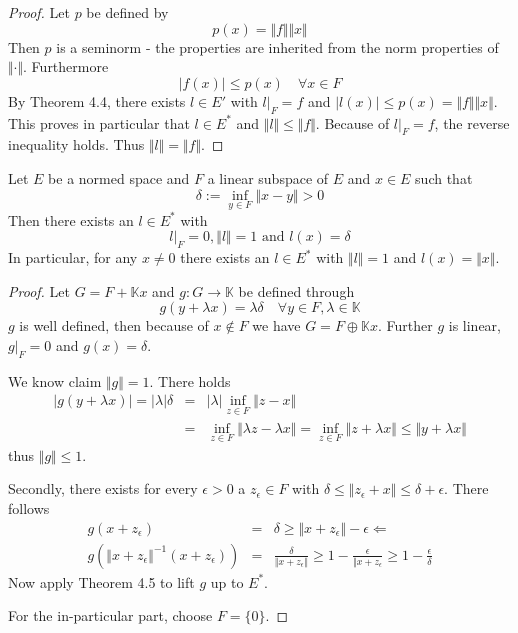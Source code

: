 \begin{proof}
Let $p$ be defined by
\begin{equation*}
p(x) = \Vert f \Vert \Vert x \Vert
\end{equation*}
Then $p$ is a seminorm - the properties are inherited from the norm properties of $\Vert \cdot \Vert$. Furthermore
\begin{equation*}
\vert f(x) \vert \leq p(x) \quad \forall x\in F
\end{equation*}
By Theorem 4.4, there exists $l \in E'$ with $l \vert_F=f$ and $ \vert l (x) \vert \leq p(x)= \Vert f \Vert \Vert x \Vert$. This proves in particular that $l \in E^{\ast}$ and $\Vert l \Vert \leq \Vert f \Vert$. Because of $l \vert_F=f$, the reverse inequality holds. Thus $\Vert l \Vert = \Vert f \Vert$. 
\end{proof}

\begin{kor}
Let $E$ be a normed space and $F$ a linear subspace of $E$ and $x \in E$ such that
\begin{equation*}
\delta := \inf_{y \in F} \Vert x - y \Vert >0
\end{equation*}
Then there exists an $l \in E^{\ast}$ with
\begin{equation*}
l \vert_F =0, \Vert l \Vert =1 \text{ and } l(x)=\delta
\end{equation*}
In particular, for any $x\neq0$ there exists an $l \in E^{\ast}$ with $\Vert l \Vert =1$ and $l(x)= \Vert x\Vert $.
\end{kor}
\begin{proof}
Let $G=F + \mathbb{K}x$ and $g: G \to \mathbb{K}$ be defined through
\begin{equation*}
g(y + \lambda x)= \lambda \delta \quad \forall y \in F, \lambda \in \mathbb{K}
\end{equation*}
$g$ is well defined, then because of $x \notin F$ we have $G = F \oplus \mathbb{K}x$. Further $g$ is linear, $g\vert_F=0$ and $g(x)=\delta$.

We know claim $\Vert g \Vert =1$. There holds
\begin{eqnarray*}
\vert g(y + \lambda x) \vert = \vert \lambda \vert \delta &=& \vert \lambda \vert \inf_{z \in F} \Vert z-x \Vert \\ &=& \inf_{z \in F} \Vert \lambda z - \lambda x \Vert = \inf_{z \in F} \Vert z+\lambda x \Vert \leq \Vert y + \lambda x \Vert
\end{eqnarray*}
thus $\Vert g \Vert \leq 1$.

Secondly, there exists for every $\epsilon>0$ a $z_{\epsilon} \in F$ with $\delta \leq \Vert z_{\epsilon} + x \Vert \leq \delta + \epsilon$. There follows
\begin{eqnarray*}
g(x + z_{\epsilon})&=& \delta \geq \Vert x+z_{\epsilon} \Vert - \epsilon \Leftarrow \\
g(\Vert x+ z_{\epsilon} \Vert^{-1}(x+z_{\epsilon})) &=&  \frac{\delta}{\Vert x+z_{\epsilon}\Vert} \geq 1 - \frac{\epsilon}{\Vert x + z_{\epsilon}} \geq 1-\frac{\epsilon}{\delta}
\end{eqnarray*}
Now apply Theorem 4.5 to lift $g$ up to $E^{\ast}$.

For the in-particular part, choose $F=\{0\}$.
\end{proof}

